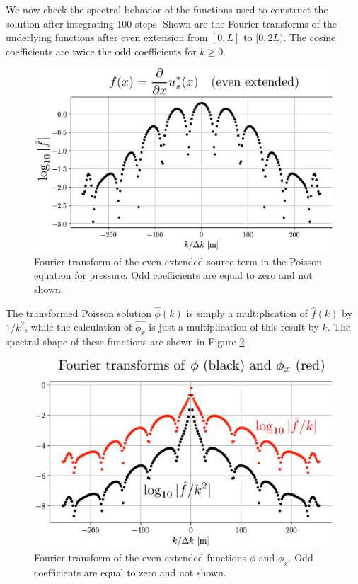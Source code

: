 \documentclass{jfm}
\begin{document}
We now check the spectral behavior of the functions used to construct the solution after integrating 100 steps. Shown are the Fourier transforms of the underlying functions after even extension from $[0,L]$ to $[0,2L)$.
The cosine coefficients are twice the odd coefficients for $k \ge 0$.
 \begin{figure}
  \centerline{\includegraphics[width=1.0\textwidth]{FIGS/explicit_100steps/rhs_spectrum.eps}}
  \caption{Fourier transform of the even-extended source term in the Poisson equation for pressure. Odd coefficients are equal to zero and not shown. }
  \label{fig:rhs_spectrum}
\end{figure}
The transformed Poisson solution ${\hat \phi}(k)$ is simply a multiplication of ${\hat f}(k)$ by $1/k^2$, while the calculation of $\hat{\phi_x}$ is just a multiplication of this result by $k$. The spectral shape of these functions are shown in Figure \ref{fig:p_spectrum}.
 \begin{figure}
  \centerline{\includegraphics[width=1.0\textwidth]{FIGS/explicit_100steps/p_spectrum.eps}}
  \caption{Fourier transform of the even-extended functions $\phi$ and $\phi_x$. Odd coefficients are equal to zero and not shown. }
  \label{fig:p_spectrum}
\end{figure}
\clearpage
\end{document}
